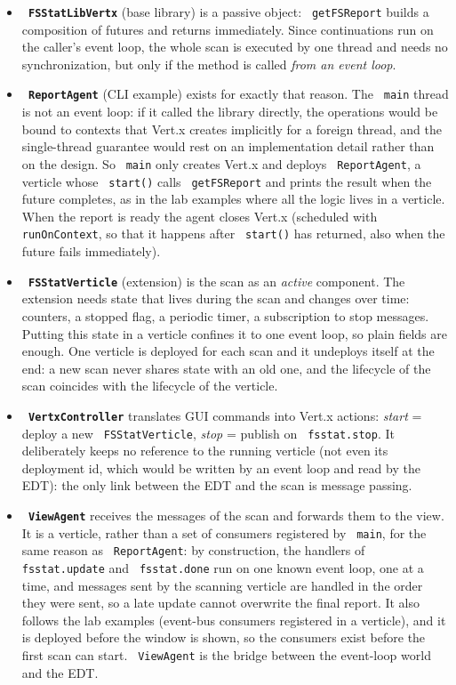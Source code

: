 \documentclass[11pt,a4paper]{article}
\newcommand{\code}[1]{\texttt{\hyphenchar\font=-1 #1}}
\begin{document}
\begin{itemize}
  \item \textbf{\code{FSStatLibVertx}} (base library) is a passive object: \code{getFSReport} builds a
        composition of futures and returns immediately. Since continuations run on the caller's
        event loop, the whole scan is executed by one thread and needs no synchronization, but only if
        the method is called \emph{from an event loop}.
  \item \textbf{\code{ReportAgent}} (CLI example) exists for exactly that reason. The \code{main}
        thread is not an event loop: if it called the library directly, the operations would be bound
        to contexts that Vert.x creates implicitly for a foreign thread, and the single-thread
        guarantee would rest on an implementation detail rather than on the design. So \code{main}
        only creates Vert.x and deploys \code{ReportAgent}, a verticle whose \code{start()} calls
        \code{getFSReport} and prints the result when the future completes, as in the lab examples
        where all the logic lives in a verticle. When the report is ready the agent closes Vert.x
        (scheduled with \code{runOnContext}, so that it happens after \code{start()} has returned,
        also when the future fails immediately).
  \item \textbf{\code{FSStatVerticle}} (extension) is the scan as an \emph{active} component. The
        extension needs state that lives during the scan and changes over time: counters, a stopped
        flag, a periodic timer, a subscription to stop messages. Putting this state in a verticle
        confines it to one event loop, so plain fields are enough. One verticle is deployed for each
        scan and it undeploys itself at the end: a new scan never shares state with an old one, and
        the lifecycle of the scan coincides with the lifecycle of the verticle.
  \item \textbf{\code{VertxController}} translates GUI commands into Vert.x actions:
        \emph{start} = deploy a new \code{FSStatVerticle}, \emph{stop} = publish on \code{fsstat.stop}.
        It deliberately keeps no reference to the running verticle (not even its deployment id, which
        would be written by an event loop and read by the EDT): the only link between the EDT and the
        scan is message passing.
  \item \textbf{\code{ViewAgent}} receives the messages of the scan and forwards them to the view.
        It is a verticle, rather than a set of consumers registered by \code{main}, for the same
        reason as \code{ReportAgent}: by construction, the handlers of \code{fsstat.update} and
        \code{fsstat.done} run on one known event loop, one at a time, and messages sent by the
        scanning verticle are handled in the order they were sent, so a late update cannot overwrite
        the final report. It also follows the lab examples (event-bus consumers registered in a
        verticle), and it is deployed before the window is shown, so the consumers exist before the
        first scan can start. \code{ViewAgent} is the bridge between the event-loop world and the EDT.
\end{itemize}
\end{document}
